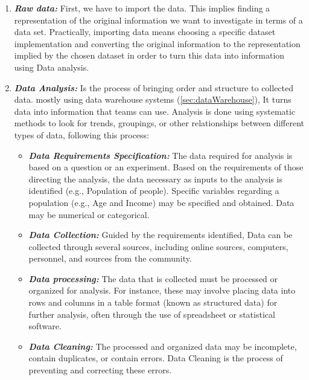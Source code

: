  
\begin{enumerate}
  \item \textbf{\textit{Raw data:}} First, we have to import the data. This implies finding a representation of the original information we want to investigate in terms of a data set. Practically, importing data means choosing a specific dataset implementation and converting the original information to the representation implied by the chosen dataset in order to turn this data into information using Data analysis.
  \item \textbf{\textit{Data Analysis:}} Is the process of bringing order and structure to collected data. mostly using data warehouse systems (\ref{sec:dataWarehouse}), It turns data into information  that teams can use. Analysis is done using systematic methods to look for trends, groupings, or other relationships between different types of data\cite{DataAnalysisVisualization}, following this process:
  \begin{itemize}
    \renewcommand{\labelitemi}{$\bullet$}
  \item \textbf{\textit{Data Requirements Specification:}} The data required for analysis is based on a question or an experiment. Based on the requirements of those directing the analysis, the data necessary as inputs to the analysis is identified (e.g., Population of people). Specific variables regarding a population (e.g., Age and Income) may be specified and obtained. Data may be numerical or categorical\cite{DataAnalysisProcess}.
  \item \textbf{\textit{Data Collection:}} Guided by the requirements identified, Data can be collected through several sources, including online sources, computers, personnel, and sources from the community.
  \item \textbf{\textit{Data processing:}} The data that is collected must be processed or organized for analysis. For instance, these may involve placing data into rows and columns in a table format (known as structured data) for further analysis, often through the use of spreadsheet or statistical software\cite{DataAnalysis2022}.
  \item \textbf{\textit{Data Cleaning:}} The processed and organized data may be incomplete, contain duplicates, or contain errors. Data Cleaning is the process of preventing and correcting these errors\cite{DataAnalysisProcess}. 

\end{itemize}
\end{enumerate}
